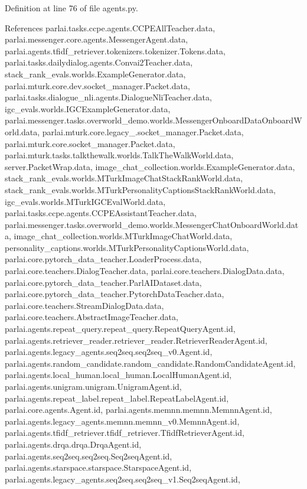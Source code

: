 Definition at line 76 of file agents.\+py.



References parlai.\+tasks.\+ccpe.\+agents.\+C\+C\+P\+E\+All\+Teacher.\+data, parlai.\+messenger.\+core.\+agents.\+Messenger\+Agent.\+data, parlai.\+agents.\+tfidf\+\_\+retriever.\+tokenizers.\+tokenizer.\+Tokens.\+data, parlai.\+tasks.\+dailydialog.\+agents.\+Convai2\+Teacher.\+data, stack\+\_\+rank\+\_\+evals.\+worlds.\+Example\+Generator.\+data, parlai.\+mturk.\+core.\+dev.\+socket\+\_\+manager.\+Packet.\+data, parlai.\+tasks.\+dialogue\+\_\+nli.\+agents.\+Dialogue\+Nli\+Teacher.\+data, igc\+\_\+evals.\+worlds.\+I\+G\+C\+Example\+Generator.\+data, parlai.\+messenger.\+tasks.\+overworld\+\_\+demo.\+worlds.\+Messenger\+Onboard\+Data\+Onboard\+World.\+data, parlai.\+mturk.\+core.\+legacy\+\_.\+socket\+\_\+manager.\+Packet.\+data, parlai.\+mturk.\+core.\+socket\+\_\+manager.\+Packet.\+data, parlai.\+mturk.\+tasks.\+talkthewalk.\+worlds.\+Talk\+The\+Walk\+World.\+data, server.\+Packet\+Wrap.\+data, image\+\_\+chat\+\_\+collection.\+worlds.\+Example\+Generator.\+data, stack\+\_\+rank\+\_\+evals.\+worlds.\+M\+Turk\+Image\+Chat\+Stack\+Rank\+World.\+data, stack\+\_\+rank\+\_\+evals.\+worlds.\+M\+Turk\+Personality\+Captions\+Stack\+Rank\+World.\+data, igc\+\_\+evals.\+worlds.\+M\+Turk\+I\+G\+C\+Eval\+World.\+data, parlai.\+tasks.\+ccpe.\+agents.\+C\+C\+P\+E\+Assistant\+Teacher.\+data, parlai.\+messenger.\+tasks.\+overworld\+\_\+demo.\+worlds.\+Messenger\+Chat\+Onboard\+World.\+data, image\+\_\+chat\+\_\+collection.\+worlds.\+M\+Turk\+Image\+Chat\+World.\+data, personality\+\_\+captions.\+worlds.\+M\+Turk\+Personality\+Captions\+World.\+data, parlai.\+core.\+pytorch\+\_\+data\+\_\+teacher.\+Loader\+Process.\+data, parlai.\+core.\+teachers.\+Dialog\+Teacher.\+data, parlai.\+core.\+teachers.\+Dialog\+Data.\+data, parlai.\+core.\+pytorch\+\_\+data\+\_\+teacher.\+Parl\+A\+I\+Dataset.\+data, parlai.\+core.\+pytorch\+\_\+data\+\_\+teacher.\+Pytorch\+Data\+Teacher.\+data, parlai.\+core.\+teachers.\+Stream\+Dialog\+Data.\+data, parlai.\+core.\+teachers.\+Abstract\+Image\+Teacher.\+data, parlai.\+agents.\+repeat\+\_\+query.\+repeat\+\_\+query.\+Repeat\+Query\+Agent.\+id, parlai.\+agents.\+retriever\+\_\+reader.\+retriever\+\_\+reader.\+Retriever\+Reader\+Agent.\+id, parlai.\+agents.\+legacy\+\_\+agents.\+seq2seq.\+seq2seq\+\_\+v0.\+Agent.\+id, parlai.\+agents.\+random\+\_\+candidate.\+random\+\_\+candidate.\+Random\+Candidate\+Agent.\+id, parlai.\+agents.\+local\+\_\+human.\+local\+\_\+human.\+Local\+Human\+Agent.\+id, parlai.\+agents.\+unigram.\+unigram.\+Unigram\+Agent.\+id, parlai.\+agents.\+repeat\+\_\+label.\+repeat\+\_\+label.\+Repeat\+Label\+Agent.\+id, parlai.\+core.\+agents.\+Agent.\+id, parlai.\+agents.\+memnn.\+memnn.\+Memnn\+Agent.\+id, parlai.\+agents.\+legacy\+\_\+agents.\+memnn.\+memnn\+\_\+v0.\+Memnn\+Agent.\+id, parlai.\+agents.\+tfidf\+\_\+retriever.\+tfidf\+\_\+retriever.\+Tfidf\+Retriever\+Agent.\+id, parlai.\+agents.\+drqa.\+drqa.\+Drqa\+Agent.\+id, parlai.\+agents.\+seq2seq.\+seq2seq.\+Seq2seq\+Agent.\+id, parlai.\+agents.\+starspace.\+starspace.\+Starspace\+Agent.\+id, parlai.\+agents.\+legacy\+\_\+agents.\+seq2seq.\+seq2seq\+\_\+v1.\+Seq2seq\+Agent.\+id, 